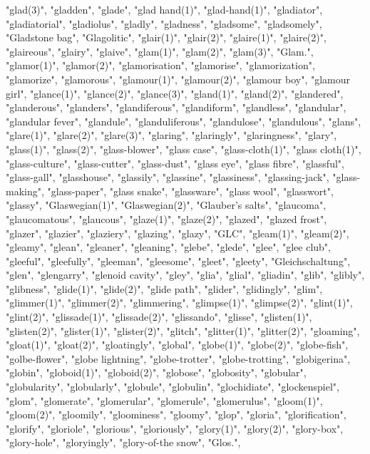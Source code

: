 "glad(3)",
"gladden",
"glade",
"glad hand(1)",
"glad-hand(1)",
"gladiator",
"gladiatorial",
"gladiolus",
"gladly",
"gladness",
"gladsome",
"gladsomely",
"Gladstone bag",
"Glagolitic",
"glair(1)",
"glair(2)",
"glaire(1)",
"glaire(2)",
"glaireous",
"glairy",
"glaive",
"glam(1)",
"glam(2)",
"glam(3)",
"Glam.",
"glamor(1)",
"glamor(2)",
"glamorisation",
"glamorise",
"glamorization",
"glamorize",
"glamorous",
"glamour(1)",
"glamour(2)",
"glamour boy",
"glamour girl",
"glance(1)",
"glance(2)",
"glance(3)",
"gland(1)",
"gland(2)",
"glandered",
"glanderous",
"glanders",
"glandiferous",
"glandiform",
"glandless",
"glandular",
"glandular fever",
"glandule",
"glanduliferous",
"glandulose",
"glandulous",
"glans",
"glare(1)",
"glare(2)",
"glare(3)",
"glaring",
"glaringly",
"glaringness",
"glary",
"glass(1)",
"glass(2)",
"glass-blower",
"glass case",
"glass-cloth(1)",
"glass cloth(1)",
"glass-culture",
"glass-cutter",
"glass-dust",
"glass eye",
"glass fibre",
"glassful",
"glass-gall",
"glasshouse",
"glassily",
"glassine",
"glassiness",
"glassing-jack",
"glass-making",
"glass-paper",
"glass snake",
"glassware",
"glass wool",
"glasswort",
"glassy",
"Glaswegian(1)",
"Glaswegian(2)",
"Glauber's salts",
"glaucoma",
"glaucomatous",
"glaucous",
"glaze(1)",
"glaze(2)",
"glazed",
"glazed frost",
"glazer",
"glazier",
"glaziery",
"glazing",
"glazy",
"GLC",
"gleam(1)",
"gleam(2)",
"gleamy",
"glean",
"gleaner",
"gleaning",
"glebe",
"glede",
"glee",
"glee club",
"gleeful",
"gleefully",
"gleeman",
"gleesome",
"gleet",
"gleety",
"Gleichschaltung",
"glen",
"glengarry",
"glenoid cavity",
"gley",
"glia",
"glial",
"gliadin",
"glib",
"glibly",
"glibness",
"glide(1)",
"glide(2)",
"glide path",
"glider",
"glidingly",
"glim",
"glimmer(1)",
"glimmer(2)",
"glimmering",
"glimpse(1)",
"glimpse(2)",
"glint(1)",
"glint(2)",
"glissade(1)",
"glissade(2)",
"glissando",
"glisse",
"glisten(1)",
"glisten(2)",
"glister(1)",
"glister(2)",
"glitch",
"glitter(1)",
"glitter(2)",
"gloaming",
"gloat(1)",
"gloat(2)",
"gloatingly",
"global",
"globe(1)",
"globe(2)",
"globe-fish",
"golbe-flower",
"globe lightning",
"globe-trotter",
"globe-trotting",
"globigerina",
"globin",
"globoid(1)",
"globoid(2)",
"globose",
"globosity",
"globular",
"globularity",
"globularly",
"globule",
"globulin",
"glochidiate",
"glockenspiel",
"glom",
"glomerate",
"glomerular",
"glomerule",
"glomerulus",
"gloom(1)",
"gloom(2)",
"gloomily",
"gloominess",
"gloomy",
"glop",
"gloria",
"glorification",
"glorify",
"gloriole",
"glorious",
"gloriously",
"glory(1)",
"glory(2)",
"glory-box",
"glory-hole",
"gloryingly",
"glory-of-the snow",
"Glos.",
